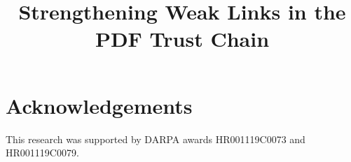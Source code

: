 \documentclass[conference,10pt]{IEEEtran}
\begin{document}
\date{}

\title{Strengthening Weak Links in the PDF Trust Chain}

\author{
     \and
}

\maketitle
\thispagestyle{plain} %



\begin{comment}
CONVENTION:
 - using this lstlisting[style=meta] environment to capture
   text in outline form that has not been fleshed ourelt / turned into prose.

META NOTES:  
- aim for 12 pages (in 10pt) (langsec specifies no limit)

TERMS (to actually use, and define when needed):
- ``complies with standard'', ``compatible with standard''
- Pre-DOM
- XRef (capitalized thus)
- Trust Chain (no quotes) [remove upper case?]
- parser differential
\end{comment}















\section*{Acknowledgements}

This research was supported by DARPA awards HR001119C0073 and
HR001119C0079.





\appendix


\end{document}
